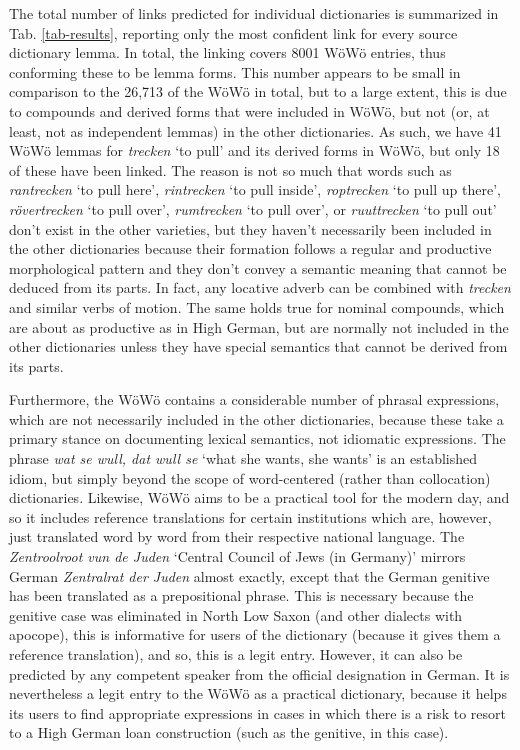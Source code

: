 \documentclass[11pt]{article}
\newcommand{\word}[1]{\textsl{#1}} %
\begin{document}
\begin{enumerate}
The total number of links predicted for individual dictionaries is summarized in Tab. \ref{tab-results}, reporting only the most confident link for every source dictionary lemma.
In total, the linking covers 8001 WöWö entries, thus conforming these to be lemma forms. This number appears to be small in comparison to the 26,713 of the WöWö in total, but to a large extent, this is due to compounds and derived forms that were included in WöWö, but not (or, at least, not as independent lemmas) in the other dictionaries. As such, we have 41 WöWö lemmas for \word{trecken} `to pull' and its derived forms in WöWö, but only 18 of these have been linked. The reason is not so much that words such as \word{rantrecken} `to pull here', \word{rintrecken} `to pull inside', \word{roptrecken} `to pull up there', \word{rövertrecken} `to pull over', \word{rumtrecken} `to pull over', or \word{ruuttrecken} `to pull out' don't exist in the other varieties, but they haven't necessarily been included in the other dictionaries because their formation follows a regular and productive morphological pattern and they don't convey a semantic meaning that cannot be deduced from its parts. In fact, any locative adverb can be combined with \word{trecken} and similar verbs of motion. The same holds true for nominal compounds, which are about as productive as in High German, but are normally not included in the other dictionaries unless they have special semantics that cannot be derived from its parts.

Furthermore, the WöWö contains a considerable number of phrasal expressions, which are not necessarily included in the other dictionaries, because these take a primary stance on documenting lexical semantics, not idiomatic expressions. The phrase \word{wat se wull, dat wull se} `what she wants, she wants' is an established idiom, but simply beyond the scope of word-centered (rather than collocation) dictionaries. Likewise, WöWö aims to be a practical tool for the modern day, and so it includes reference translations for certain institutions which are, however, just translated word by word from their respective national language. The \word{Zentroolroot vun de Juden} `Central Council of Jews (in Germany)' mirrors German \word{Zentralrat der Juden} almost exactly, except that the German genitive has been translated as a prepositional phrase. This is necessary because the genitive case was eliminated in North Low Saxon (and other dialects with apocope), this is informative for users of the dictionary (because it gives them a reference translation), and so, this is a legit entry. However, it can also be predicted by any competent speaker from the official designation in German. It is nevertheless a legit entry to the WöWö as a practical dictionary, because it helps its users to find appropriate expressions in cases in which there is a risk to resort to a High German loan construction (such as the genitive, in this case).


\end{enumerate}
\end{document}
